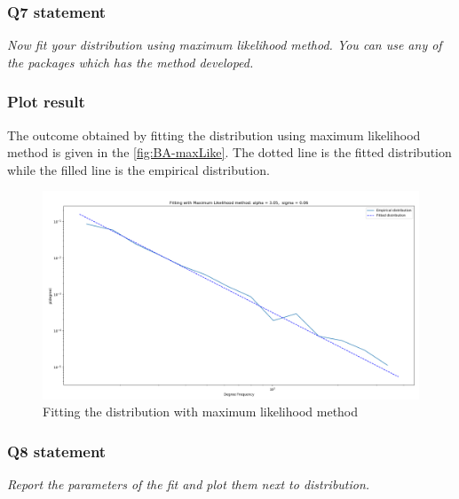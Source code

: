 \documentclass{article}
\begin{document}
\subsubsection{Q7 statement}
\textit{Now fit your distribution using maximum likelihood method. You can use any of the packages which has the method developed.}

\subsubsection*{Plot result}
The outcome obtained by fitting the distribution using maximum likelihood method is given in the \autoref{fig:BA-maxLike}. The dotted line is the fitted distribution while the filled line is the empirical distribution. 

\begin{figure}[h]
  \centering
  \includegraphics[scale=0.35]{fig/BA-maxLike-bis.png}
  \caption{Fitting the distribution with maximum likelihood method}
  \label{fig:BA-maxLike}
\end{figure}

\subsubsection{Q8 statement}
\textit{Report the parameters of the fit and plot them next to distribution.}
\end{document}

